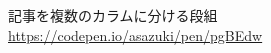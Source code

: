 \documentclass{jsarticle}
\begin{document}
\begin{thebibliography}{99}
    \bibitem{} 記事を複数のカラムに分ける段組 \\
    \url{https://codepen.io/asazuki/pen/pgBEdw}
\end{thebibliography}
\end{document}
